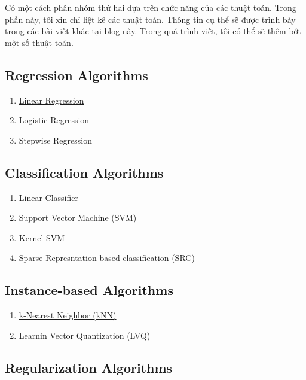 Có một cách phân nhóm thứ hai dựa trên chức năng của các thuật toán. Trong phần này, tôi xin chỉ liệt kê các thuật toán. Thông tin cụ thể sẽ được trình bày trong các bài viết khác tại blog này. Trong quá trình viết, tôi có thể sẽ thêm bớt một số thuật toán.  
 
 
\subsection{Regression Algorithms}
\begin{enumerate}
  \item \href{http://machinelearningcoban.com/2016/12/28/linearregression/}{Linear Regression} 

  \item \href{http://machinelearningcoban.com/2017/01/27/logisticregression/#sigmoid-function}{Logistic Regression} 

  
  \item Stepwise Regression 
\end{enumerate}
 
 
\subsection{Classification Algorithms }

\begin{enumerate}
  \item Linear Classifier

  \item  Support Vector Machine (SVM)

  \item  Kernel SVM  

  \item Sparse Represntation-based classification (SRC) 
\end{enumerate}
 
 
\subsection{Instance-based Algorithms }
 
 \begin{enumerate}
   \item \href{http://machinelearningcoban.com/2017/01/08/knn/}{k-Nearest Neighbor (kNN)} 

   \item Learnin Vector Quantization (LVQ) 
 \end{enumerate}
 
 
\subsection{Regularization Algorithms }
 
